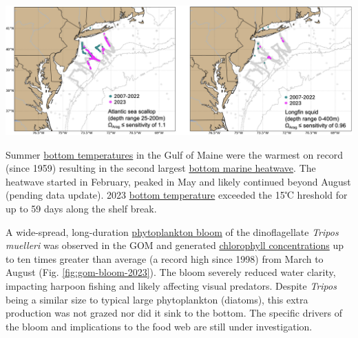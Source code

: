 \documentclass[
  10pt,
]{article}
\let\origfigure\figure
\let\endorigfigure\endfigure
\renewenvironment{figure}[1][2] {
    \expandafter\origfigure\expandafter[H]
} {
    \endorigfigure
}
\begin{document}
\begin{figure}

{\centering \includegraphics[width=1\linewidth]{images/Figure6_GraceSaba_2024} 

}

\caption{Left: Mission tracks of three gliders deployed off the coast of New Jersey in August and September of 2023. Right: Locations of hypoxic levels of dissolved oxygen (magenta; < 3 mg/liter) and low aragonite saturation state (cyan; < 1) measured along the glider mission tracks and locations of reported fish, lobster, and/or crab mortalities (red X).}\label{fig:hypoxia-2023}
\end{figure}

Summer \href{https://noaa-edab.github.io/catalog/bottom-temperature---seasonal-anomaly.html}{bottom temperatures} in the Gulf of Maine were the warmest on record (since 1959) resulting in the second largest \href{https://noaa-edab.github.io/catalog/marine-heatwaves---bottom.html}{bottom marine heatwave}. The heatwave started in February, peaked in May and likely continued beyond August (pending data update). 2023 \href{https://noaa-edab.github.io/catalog/thermal-habitat-persistence.html}{bottom temperature} exceeded the 15℃ hreshold for up to 59 days along the shelf break.

A wide-spread, long-duration \href{https://noaa-edab.github.io/catalog/observation-synthesis.html}{phytoplankton bloom} of the dinoflagellate \emph{Tripos muelleri} was observed in the GOM and generated \href{https://noaa-edab.github.io/catalog/chlorophyll-and-primary-production.html}{chlorophyll concentrations} up to ten times greater than average (a record high since 1998) from March to August (Fig. \ref{fig:gom-bloom-2023}). The bloom severely reduced water clarity, impacting harpoon fishing and likely affecting visual predators. Despite \emph{Tripos} being a similar size to typical large phytoplankton (diatoms), this extra production was not grazed nor did it sink to the bottom. The specific drivers of the bloom and implications to the food web are still under investigation.
\end{document}
